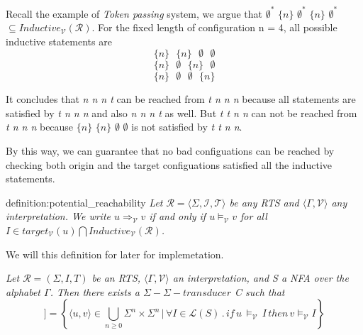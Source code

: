 Recall the example of \textit{Token passing} system,
we argue that $\emptyset^*$ $\lbrace n \rbrace$ $\emptyset^*$ $\lbrace n \rbrace$ $\emptyset^*$
$\subseteq Inductive_{\mathcal{V}}(\mathcal{R})$. For the fixed
length of configuration n = 4, all possible inductive statements
are 
\[
    \lbrace n \rbrace\,\,\,\, \lbrace n \rbrace \,\,\,\,  \emptyset \,\,\,\, \emptyset
\]
\[
    \lbrace n \rbrace\,\,\,\, \emptyset \,\,\,\, \lbrace n \rbrace \,\,\,\,  \emptyset
\]
\[
    \lbrace n \rbrace \,\,\,\, \emptyset \,\,\,\, \emptyset \,\,\,\, \lbrace n \rbrace
\]

It concludes that \textit{n n n t} can be reached from \textit{t n n n} because
all statements are satisfied by \textit{t n n n} and also \textit{n n n t} as well.
But \textit{t t n n} can not be reached from \textit{t n n n} because 
$\lbrace n \rbrace$ $\lbrace n \rbrace$  $\emptyset$  $\emptyset$
is not satisfied by \textit{t t n n}.

By this way, we can guarantee that no bad configuations can be reached
by checking both origin and the target configuations satisfied all
the inductive statements.

\begin{theo}{definition:potential_reachability}
    \textit{
   Let $\mathcal{R} = \langle \Sigma, \mathcal{I}, \mathcal{T} \rangle$ be any \textit{RTS}
   and $\langle \Gamma, \mathcal{V} \rangle$ any interpretation.
   We write $u \Rightarrow_{\mathcal{V}} v$ if and only if $u \models_{\mathcal{V}} v$
   for all $I \in target_\mathcal{V}(u) \bigcap Inductive_\mathcal{V}(\mathcal{R})$.
   }
\end{theo}

We will this definition for later for implemetation. 

\begin{lemma}\label{lemma:abstractly_reachable}
    \cite{latex}
\end{lemma}
\textit{
    Let $\mathcal{R} = (\Sigma, I, T)$ be an RTS, $\langle \Gamma, \mathcal{V} \rangle$ an interpretation, 
    and S a NFA over the alphabet $\Gamma$. Then there exists a  $\Sigma-\Sigma-transducer$ C such that
}
\begin{equation*}
    [[C]] = \left\lbrace \langle u,v\rangle \in \bigcup_{n \geq 0} \Sigma^n \times \Sigma^n \, | \, \forall I \in \mathcal{L}(S) \, . \, if \, u \, \models_{\mathcal{V}} \, I \, then \, v \models_{\mathcal{V}} I \right\rbrace
\end{equation*}